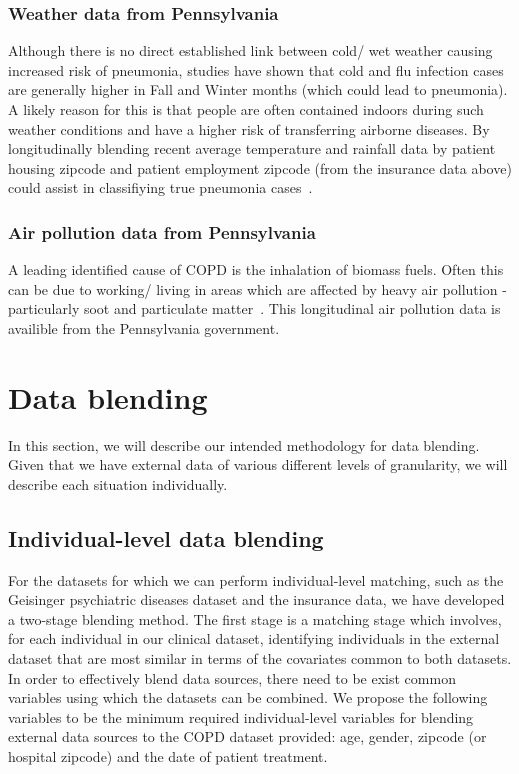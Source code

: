 \documentclass{article}
\begin{document}
\subsubsection{Weather data from Pennsylvania}
Although there is no direct established link between cold/ wet weather causing 
increased risk of pneumonia, studies have shown that cold and flu infection cases are 
generally higher in Fall and Winter months (which could lead to pneumonia). A 
likely reason for this is that people are often contained indoors during such 
weather conditions and have a higher risk of transferring airborne diseases. 
By longitudinally  blending recent average temperature and rainfall data 
by patient housing zipcode and patient employment zipcode (from the insurance 
data above) could assist in classifiying true pneumonia cases~\cite{mccoy_health_2008}. 

\subsubsection{Air pollution data from Pennsylvania}
A leading identified cause of COPD is the inhalation of biomass fuels. Often 
this can be due to working/ living in areas which are affected by heavy air 
pollution - particularly soot and particulate matter~\cite{who_who_2014}. This longitudinal air pollution data is availible from the Pennsylvania government.

\section{Data blending}
In this section, we will describe our intended methodology for data blending. 
Given that we have external data of various different levels of granularity, 
we will describe each situation individually.


\subsection{Individual-level data blending}

For the datasets for which we can perform individual-level matching, such as the Geisinger psychiatric diseases dataset and the insurance data, we have developed a two-stage blending method. The first stage is a matching stage which involves, for each individual in our clinical dataset, identifying individuals in the external dataset that are most similar in terms of the covariates common to both datasets. In order to effectively blend data sources, there need to be exist common variables using which the datasets can be combined. We propose the following variables to be the minimum required individual-level variables for blending external data sources to the COPD dataset provided: age, gender, zipcode (or hospital zipcode) and the date of patient treatment.
\end{document}
